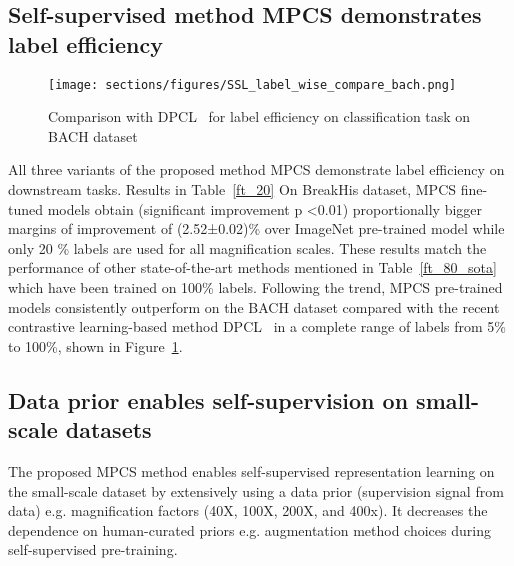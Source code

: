 \documentclass[conference]{IEEEtran}
\begin{document}
\subsection{Self-supervised method MPCS demonstrates label efficiency}

\begin{figure}[t]
    \centering
    \texttt{[image: sections/figures/SSL\_label\_wise\_compare\_bach.png]}
    \caption{Comparison with DPCL~\cite{ciga2022self} for label efficiency on classification task on BACH dataset}
    \label{fig:ssl_dpcl}
    \vspace{-7mm}
\end{figure}
All three variants of the proposed method MPCS demonstrate label efficiency on downstream tasks. Results in Table~\ref{ft_20} On BreakHis dataset, MPCS fine-tuned models obtain (significant improvement p \textless 0.01) proportionally bigger margins of improvement of (2.52±0.02)\% over ImageNet pre-trained model while only 20 \% labels are used for all magnification scales. These results match the performance of other state-of-the-art methods mentioned in Table~\ref{ft_80_sota} which have been trained on 100\% labels. Following the trend, MPCS pre-trained models consistently outperform on the BACH dataset compared with the recent contrastive learning-based method DPCL~\cite{ciga2022self} in a complete range of labels from 5\% to 100\%, shown in Figure~\ref{fig:ssl_dpcl}. 






\subsection{Data prior enables self-supervision on small-scale datasets}
The proposed MPCS method enables self-supervised representation learning on the small-scale dataset by extensively using a data prior (supervision signal from data) e.g. magnification factors (40X, 100X, 200X, and 400x). It decreases the dependence on human-curated priors e.g. augmentation method choices during self-supervised pre-training.  
\end{document}
